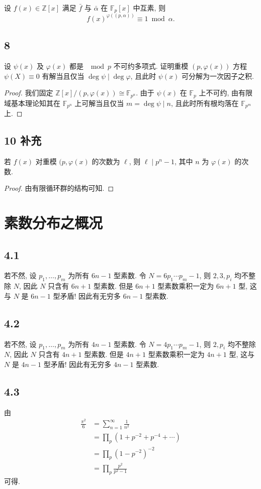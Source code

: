 \documentclass[12pt,a4paper,reqno]{amsart}
\theoremstyle{remark}
\newcommand{\Z}{\mathbb{Z}}
\newcommand{\F}{\mathbb{F}}
\begin{document}
设 $f(x)\in\Z[x]$ 满足 $\bar f$ 与 $\bar \alpha$ 在 $\F_p[x]$ 中互素, 则
  \[f(x)^{\varphi((p,\alpha))}\equiv 1\bmod \alpha.\]

\subsection*{8}
设 $\psi(x)$ 及 $\varphi(x)$ 都是 $\mod p$ 不可约多项式. 证明重模 $(p,\varphi(x))$ 方程 $\psi(X)\equiv 0$ 有解当且仅当 $\deg \psi\mid \deg \varphi$, 且此时 $\psi(x)$ 可分解为一次因子之积.
\begin{proof}
我们固定 $\Z[x]/(p,\varphi(x))\cong \F_{p^n}$. 由于 $\psi(x)$ 在 $\F_p$ 上不可约, 由有限域基本理论知其在 $\F_{p^n}$ 上可解当且仅当  $m=\deg \psi\mid n$, 且此时所有根均落在 $\F_{p^m}$ 上.
\end{proof}

\subsection*{10 补充}
若 $f(x)$ 对重模 $(p,\varphi(x)$ 的次数为 $\ell$, 则 $\ell\mid p^n-1$, 其中 $n$ 为 $\varphi(x)$ 的次数.
\begin{proof}
由有限循环群的结构可知.
\end{proof}

\section{素数分布之概况}
\subsection*{4.1}
若不然, 设 $p_1,\ldots,p_m$ 为所有 $6n-1$ 型素数. 令 $N=6p_1\cdots p_m-1$, 则 $2,3,p_i$ 均不整除 $N$, 因此 $N$ 只含有 $6n+1$ 型素数. 但是 $6n+1$ 型素数乘积一定为 $6n+1$ 型, 这与 $N$ 是 $6n-1$  型矛盾! 因此有无穷多 $6n-1$ 型素数.

\subsection*{4.2}
若不然, 设 $p_1,\ldots,p_m$ 为所有 $4n-1$ 型素数. 令 $N=4p_1\cdots p_m-1$, 则 $2,p_i$ 均不整除 $N$, 因此 $N$ 只含有 $4n+1$ 型素数. 但是 $4n+1$ 型素数乘积一定为 $4n+1$ 型, 这与 $N$ 是 $4n-1$  型矛盾! 因此有无穷多 $4n-1$ 型素数.

\subsection*{4.3}
由
  \[\begin{split}
    \frac{\pi^2}{6}&=\sum_{n=1}^\infty \frac{1}{n^2}\\
                   &=\prod_p (1+p^{-2}+p^{-4}+\cdots)\\
                   &=\prod_p (1-p^{-2})^{-2}\\
                   &=\prod_p \frac{p^2}{p^2-1}
  \end{split}\]
可得.
\end{document}
